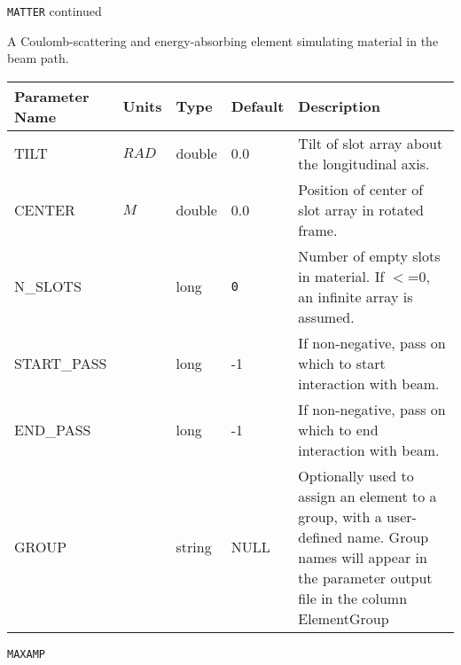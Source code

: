 \newpage
\begin{center}{\Large\verb|MATTER| continued}\end{center}
A Coulomb-scattering and energy-absorbing element simulating material in the beam path.
\\
\begin{tabular}{|l|l|l|l|p{\descwidth}|} \hline
Parameter Name & Units & Type & Default & Description \\ \hline 
TILT & $RAD$ & double &  0.0 & Tilt of slot array about the longitudinal axis.   \\ \hline 
CENTER & $M$ & double &  0.0 & Position of center of slot array in rotated frame.  \\ \hline 
N\_SLOTS &  & long &  \verb|0| & Number of empty slots in material. If $<$=0, an infinite array is assumed.  \\ \hline 
START\_PASS &  & long &   -1              & If non-negative, pass on which to start interaction with beam.  \\ \hline 
END\_PASS &  & long &   -1              & If non-negative, pass on which to end interaction with beam.  \\ \hline 
GROUP &  & string & NULL & Optionally used to assign an element to a group, with a user-defined name.  Group names will appear in the parameter output file in the column ElementGroup  \\ \hline 
\end{tabular}

\vspace*{0.5in}

\newpage
\begin{center}{\Large\verb|MAXAMP|}\end{center}
